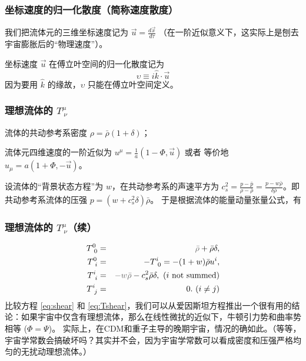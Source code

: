 \documentclass[CJK,13pt]{beamer}
\begin{document}
  \begin{frame}
    \frametitle{坐标速度的归一化散度（简称速度散度）}
    我们把流体元的三维坐标速度记为 $\vec{u} = \frac{d\vec{x}}{d\tau}$ （在一阶近似意义下，这实际上是刨去宇宙膨胀后的“物理速度”）。

    坐标速度 $\vec{u}$ 在傅立叶空间的归一化散度记为
    {\blue $$\upsilon  \equiv i\hat{k} \cdot \vec{u}$$}
     因为要用 $\hat{k}$ 的缘故，$\upsilon$ 只能在傅立叶空间定义。

  \end{frame}


    \begin{frame}
    \frametitle{理想流体的 $T^\mu_{\ \nu}$}
    \bitem
    \item{流体的共动参考系密度  $\rho = \bar{\rho}(1+\delta)$；}
    \item{ 流体元四维速度的一阶近似为 $u^\mu = \frac{1}{a} (1-\Phi, \vec{u})$ 或者 等价地 $u_\mu = a(1+\Phi, -\vec{u})$。}
    \item{设流体的“背景状态方程”为 $w$，在共动参考系的声速平方为 $c_s^2 = \frac{p-\bar{p}}{\rho-\bar{\rho}}=\frac{p-w\bar{\rho}}{\delta \bar{\rho}}$。即共动参考系流体的压强 $p  = (w + c_s^2\delta)\bar{\rho}$。}
      \eitem
      于是根据流体的能量动量张量公式，有
     
  \end{frame}
  
  \begin{frame}
    \frametitle{理想流体的  $T^\mu_{\ \nu}$（续）}
    \begin{eqnarray}
      T^0_{\ 0} &=& {\gray \bar{\rho}} + \bar{\rho}\delta, \\
      T^0_{\ i} &=& - T^i_{\ 0} = -(1+w)\bar{\rho}u^i,  \\
      T^i_{\ i} &=&  {\gray -w\bar{\rho}} - c_s^2\bar{\rho}\delta  ,\ \text{($i$ not summed)} \\
      T^i_{\ j} &=& 0.\ (i\ne j) \label{eq:Tshear}
    \end{eqnarray}
    比较方程 \eqref{eq:shear} 和 \eqref{eq:Tshear}，我们可以从爱因斯坦方程推出一个很有用的结论：{\blue 如果宇宙中仅含有理想流体，那么在线性微扰的近似下，牛顿引力势和曲率势相等 ($\Phi = \Psi$)。} 实际上，在CDM和重子主导的晚期宇宙，情况的确如此。（等等，宇宙学常数会搞破坏吗？其实并不会，因为宇宙学常数可以看成密度和压强严格均匀的无扰动理想流体。）
  \end{frame}
\end{document}

